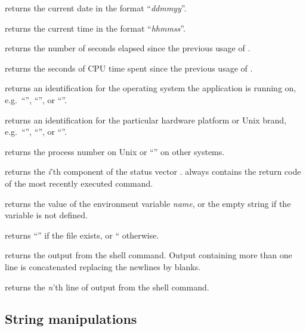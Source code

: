 \begin{UL}
\item
{} returns the current date in the format
``\textsl{dd}\Lit{/}\textsl{mm}\Lit{/}\textsl{yy}''.
\item
{} returns the current time in the format
``\textsl{hh}\Lit{/}\textsl{mm}\Lit{/}\textsl{ss}''.
\item
{} returns the number of seconds elapsed since the
previous usage of .
\item
{} returns the seconds of CPU time spent since the
previous usage of .
\item
{} returns an identification for the operating system the application is
running on, e.g.\ ``'', ``'', or ``''.
\item
{} returns an identification for the particular hardware
platform or Unix brand, e.g.\ ``'', ``'', or ``''.
\item
{} returns the process number on Unix or ``'' on
other systems.
\item
{} returns the \textsl{i}'th component of the
status vector .
 always contains the return code of the most recently
executed command.
\item
{} returns the value of the environment
variable \textsl{name}, or the empty string if the variable is not defined.
\item
{} returns ``'' if the file
exists, or `` otherwise.
\item
{} returns the output from the 
shell command.
Output containing more than one line is concatenated replacing the
newlines by blanks.
\item
{} returns the \textsl{n}'th line
of output from the shell command.
\end{UL}

\subsection{String manipulations}

